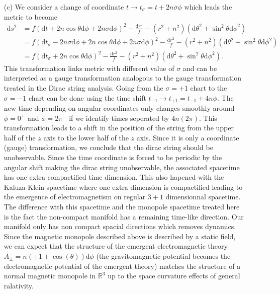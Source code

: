 \documentclass[10pt, a4paper]{article}
\begin{document}
{\begin{enumerate}
  \item[(c)] We consider a change of coordinate $t \to t_\sigma = t + 2n \sigma \phi$ which leads the metric to become
  \begin{align*}
    \text{d} s^2 &= f\left(\text{d} t + 2 n\cos \theta \text{d}\phi + 2n\sigma \text{d}\phi\right)^2-\frac{\text{d} r^2}{f}-\left(r^2+n^2\right)\left(\text{d} \theta^2+\sin ^2 \theta \text{d} \phi^2\right)\\ &=  f\left(\text{d} t_\sigma - 2n \sigma \text{d}\phi + 2 n\cos \theta \text{d}\phi + 2n\sigma \text{d}\phi \right)^2-\frac{\text{d} r^2}{f}-\left(r^2+n^2\right)\left(\text{d} \theta^2+\sin ^2 \theta \text{d} \phi^2\right)\\
    &= f\left(\text{d} t_\sigma + 2 n\cos \theta \text{d}\phi\right)^2-\frac{\text{d} r^2}{f}-\left(r^2+n^2\right)\left(\text{d} \theta^2+\sin ^2 \theta \text{d} \phi^2\right). 
  \end{align*}
  This transformation links metric with different value of $\sigma$ and can be interpreted as a gauge transformation analogous to the gauge transformation treated in the Dirac string analysis. Going from the $\sigma = +1$ chart to the $\sigma = -1$ chart can be done using the time shift $t_{-1} \to t_{+1} = t_{-1} + 4n \phi$. The new time depending on angular coordinates only changes smoothly around $\phi = 0^+$ and $\phi = 2\pi^-$ if we identify times seperated by $4n (2\pi)$. This transformation leads to a shift in the position of the string from the upper half of the $z$ axis to the lower half of the $z$ axis. Since it is only a coordinate (gauge) transformation, we conclude that the dirac string should be unobservable. Since the time coordinate is forced to be periodic by the angular shift making the dirac string unobservable, the associated spacetime has one extra compactified time dimension. This also hapened with the Kaluza-Klein spacetime where one extra dimension is compactified leading to the emergence of electromagnetism on regular $3+1$ dimensionnal spacetime. The difference with this spacetime and the monopole spacetime treated here is the fact the non-compact manifold has a remaining time-like direction. Our manifold only has non compact spacial directions which removes dynamics. Since the magnetic monopole described above is described by a static field, we can expect that the structure of the emergent electromagnetic theory $A_{\pm} = n(\pm 1 +\cos(\theta))\text{d}\phi$ (the gravitomagnetic potential becomes the electromagnetic potential of the emergent theory) matches the structure of a normal magnetic monopole in $\mathbb{R}^3$ up to the space curvature effects of general ralativity.  

\end{enumerate}}
\end{document}

